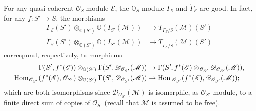 \begin{example}\label{scheme O_S-module Gamma is good}
For any quasi-coherent $\mathscr{O}_S$-module $\mathscr{E}$, the $\mathbb{O}_S$-module $\Gamma_{\mathscr{E}}$ and $\check{\Gamma}_{\mathscr{E}}$ are good. In fact, for any $f:S'\to S$, the morphisms
\begin{align*}
\Gamma_\mathscr{E}(S')\otimes_{\mathbb{O}(S')}\mathbb{O}(I_{S'}(\mathscr{M}))&\to T_{\Gamma_\mathscr{E}/S}(\mathscr{M})(S')\\
\check{\Gamma}_\mathscr{E}(S')\otimes_{\mathbb{O}(S')}\mathbb{O}(I_{S'}(\mathscr{M}))&\to T_{\check{\Gamma}_\mathscr{E}/S}(\mathscr{M})(S')
\end{align*}
correspond, respectively, to morphisms
\begin{align*}
\Gamma(S',f^*(\mathscr{E}))\otimes_{\mathbb{O}(S')}\Gamma(S',\mathscr{D}_{\mathscr{O}_{S'}}(\mathscr{M}))&\to\Gamma(S',f^*(\mathscr{E})\otimes_{\mathscr{O}_{S'}}\mathscr{D}_{\mathscr{O}_{S'}}(\mathscr{M})),\\
\mathrm{Hom}_{\mathscr{O}_{S'}}(f^*(\mathscr{E}),\mathscr{O}_{S'})\otimes_{\mathbb{O}(S')}\Gamma(S',\mathscr{D}_{\mathscr{O}_{S'}}(\mathscr{M}))&\to \mathrm{Hom}_{\mathscr{O}_{S'}}(f^*(\mathscr{E}),\mathscr{D}_{\mathscr{O}_{S'}}(\mathscr{M}));
\end{align*}
which are both isomorphisms since $\mathscr{D}_{\mathscr{O}_{S'}}(\mathscr{M})$ is isomorphic, as $\mathscr{O}_{S'}$-module, to a finite direct sum of copies of $\mathscr{O}_{S'}$ (recall that $\mathscr{M}$ is assumed to be free). 
\end{example}

